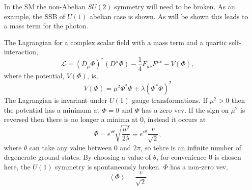 In the \ac{SM} the non-Abelian $SU(2)$ symmetry will need to be broken. As an
example, the \ac{SSB} of $U(1)$ abelian case is shown. As will be shown this
leads to a mass term for the photon.

The Lagrangian for a complex scalar field with a mass term and a quartic
self-interaction,
\begin{equation}
\mathcal{L} = (D_{\mu}\Phi)^{\ast} (D^{\mu}\Phi)
            - \frac{1}{4} F_{\mu\nu} F^{\mu\nu} - V(\Phi) ,
\end{equation}
where the potential, $V(\Phi)$, is,
\begin{equation}
V(\Phi) = \mu^{2}\Phi^{\ast}\Phi 
        + \lambda (\Phi^{\ast}\Phi )^{2}
\end{equation}
The Lagrangian is invariant under $U(1)$ gauge transformations. If $\mu^{2}>0$
then the potential has a minimum at $\Phi=0$ and $\Phi$ has a zero \ac{vev}. If
the sign on $\mu^{2}$ is reversed then there is no longer a minima at 0, instead
it occurs at 
\begin{equation}
\Phi
= e^{i\theta} \sqrt{ \frac{\mu^{2}}{2 \lambda} }
\equiv e^{i\theta} \frac{v}{\sqrt{2}} ,
\end{equation}
where $\theta$ can take any value between 0 and $2\pi$, so tehre is an infinite
number of degenerate ground states. By choosing a value of $\theta$, for
convenience 0 is chosen here, the $U(1)$ symmetry is spontaneously broken.
$\Phi$ has a non-zero \ac{vev},
\begin{equation}
\left\langle\Phi\right\rangle = \frac{v}{\sqrt{2}}
\end{equation}

